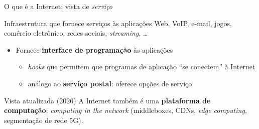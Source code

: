 \documentclass[aspectratio=169,11pt]{beamer}
\begin{document}
\begin{frame}{O que é a Internet: vista de \emph{serviço}}
  \begin{block}{Infraestrutura que fornece serviços às aplicações}
    Web, VoIP, e-mail, jogos, comércio eletrônico, redes sociais, \emph{streaming}, \ldots
  \end{block}
  \begin{itemize}
    \item Fornece \textbf{interface de programação} às aplicações
      \begin{itemize}
        \item \emph{hooks} que permitem que programas de aplicação ``se conectem'' à Internet
        \item análogo ao \textbf{serviço postal}: oferece opções de serviço
      \end{itemize}
  \end{itemize}
  \begin{exampleblock}{Vista atualizada (2026)}
    A Internet também é uma \textbf{plataforma de computação}: \emph{computing in the network} (middleboxes, CDNs, \emph{edge computing}, segmentação de rede 5G).
  \end{exampleblock}
\end{frame}
\end{document}
